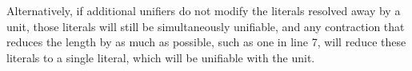 Alternatively, if additional unifiers do not modify the literals resolved away by a unit, those literals will still be simultaneously unifiable, and any contraction that reduces the length by as much as possible, such as one in line 7, will reduce these literals to a single literal, which will be unifiable with the unit. 



%


